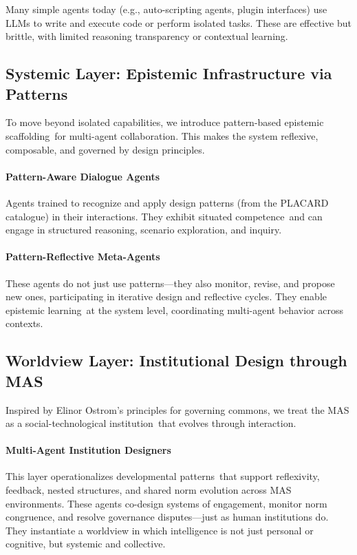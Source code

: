 \documentclass[acmlarge,timestamp]{acmart}
\begin{document}
Many simple agents today (e.g., auto-scripting agents, plugin
interfaces) use LLMs to write and execute code or perform isolated
tasks. These are effective but brittle, with limited reasoning
transparency or contextual learning.

\subsection*{ Systemic Layer: Epistemic Infrastructure via Patterns}

To move beyond isolated capabilities, we introduce pattern-based
epistemic scaffolding~for multi-agent collaboration. This makes the
system reflexive, composable, and governed by design principles.

\paragraph{Pattern-Aware Dialogue Agents}

Agents trained to recognize and apply design patterns (from the
PLACARD catalogue) in their interactions. They exhibit situated
competence~and can engage in structured reasoning, scenario
exploration, and inquiry.

\paragraph{Pattern-Reflective Meta-Agents}

These agents do not just use patterns---they also monitor, revise, and
propose new ones, participating in iterative design and reflective
cycles. They enable epistemic learning~at the system level,
coordinating multi-agent behavior across contexts.

\subsection*{ Worldview Layer: Institutional Design through MAS}

Inspired by Elinor Ostrom's principles for governing commons, we treat
the MAS as a social-technological institution~that evolves through
interaction.

\paragraph{Multi-Agent Institution Designers}

This layer operationalizes developmental patterns~that support
reflexivity, feedback, nested structures, and shared norm evolution
across MAS environments. These agents co-design systems of engagement,
monitor norm congruence, and resolve governance disputes---just as
human institutions do. They instantiate a worldview in which
intelligence is not just personal or cognitive, but systemic and
collective. ~
\end{document}
